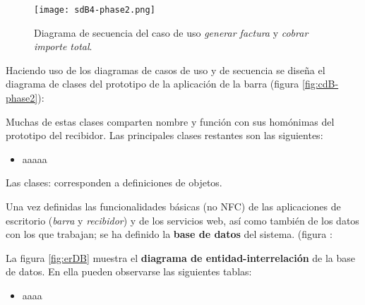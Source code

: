 \begin{itemize}
  \begin{sidewaysfigure}[h]
    \begin{center}
      \texttt{[image: sdB4-phase2.png]}
      \caption{Diagrama de secuencia del caso de uso \emph{generar factura}
      y \emph{cobrar importe total}.}
      \label{fig:sdB4-phase2}
    \end{center}
  \end{sidewaysfigure}
\end{itemize}

Haciendo uso de los diagramas de casos de uso y de secuencia se
diseña el diagrama de clases del prototipo de la aplicación de la barra
(figura \ref{fig:cdB-phase2}):


Muchas de estas clases comparten nombre y función con sus homónimas del
prototipo del recibidor. Las principales clases restantes son las siguientes:
\begin{itemize}
\item aaaaa
\end{itemize}
Las clases: %
corresponden a definiciones de objetos.

Una vez definidas las funcionalidades básicas (no \acs{NFC}) de las
aplicaciones de escritorio (\emph{barra} y \emph{recibidor}) y de los servicios 
web, así como también de los datos con los que trabajan; se ha definido la 
\textbf{base de datos} del sistema. (figura :


La figura \ref{fig:erDB} muestra el \textbf{diagrama de entidad-interrelación} 
de la base de datos. En ella pueden observarse las siguientes tablas:
\begin{itemize}
\item aaaa
\end{itemize}

